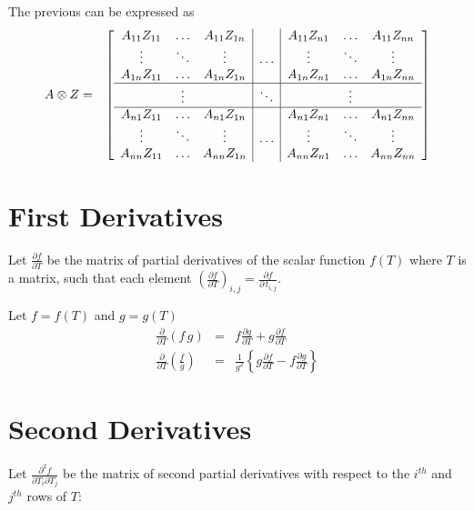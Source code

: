 \documentclass{report}
\begin{document}
\noindent The previous can be expressed as
\begin{eqnarray}
A \otimes Z & = &
\left[ \begin{array}{ccc|c|ccc}
A_{11} Z_{11} &
\ldots &
A_{11} Z_{1n} &
&
A_{11} Z_{n1} &
\ldots &
A_{11} Z_{nn} \\
\vdots & \ddots & \vdots &
\ldots &
\vdots & \ddots & \vdots \\
A_{1n} Z_{11} &
\ldots &
A_{1n} Z_{1n} &
&
A_{1n} Z_{n1} &
\ldots &
A_{1n} Z_{nn} \\
\hline
& \vdots & & \ddots & & \vdots \\
\hline
A_{n1} Z_{11} &
\ldots &
A_{n1} Z_{1n} &
&
A_{n1} Z_{n1} &
\ldots &
A_{n1} Z_{nn} \\
\vdots & \ddots & \vdots &
\ldots &
\vdots & \ddots & \vdots \\
A_{nn} Z_{11} &
\ldots &
A_{nn} Z_{1n} &
&
A_{nn} Z_{n1} &
\ldots &
A_{nn} Z_{nn} 
\end{array} \right] \nonumber \label{matrix-outer} \\
\end{eqnarray}

\section{First Derivatives}

Let $\frac{\partial f}{\partial T}$ be the matrix of partial derivatives of the scalar function $f(T)$ where $T$ is a matrix, such that each element 
$\left(\frac{\partial f}{\partial T}\right)_{i,j} = \frac{\partial f}{\partial \, t_{i,j}}$.

\noindent Let $f=f(T)$ and $g=g(T)$
\begin{eqnarray}
\frac{\partial}{\partial T} \left( f \, g \right) & = & f \frac{\partial g}{\partial T} + g \frac{\partial f}{\partial T} \label{prod1} \\
\frac{\partial}{\partial T} \left( \frac{f}{g} \right) & = & \frac{1}{g^2} \left\{ g \frac{\partial f}{\partial T} - f \frac{\partial g}{\partial T} \right\} \label{quotient1}
\end{eqnarray}


\section{Second Derivatives}

Let $\frac{\partial^2 f}{\partial T_i \partial T_j}$ be the matrix of second partial derivatives with respect to the $i^{th}$ and $j^{th}$ rows of $T$:
\end{document}
